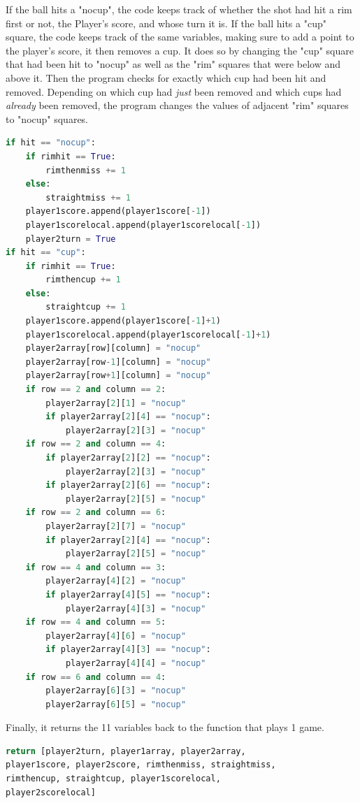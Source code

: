 \documentclass{article}
\begin{document}
If the ball hits a "nocup", the code keeps track of whether the shot had hit a rim first or not, the Player's score, and whose turn it is. If the ball hits a "cup" square, the code keeps track of the same variables, making sure to add a point to the player's score, it then removes a cup. It does so by changing the "cup" square that had been hit to "nocup" as well as the "rim" squares that were below and above it. Then the program checks for exactly which cup had been hit and removed. Depending on which cup had \textit{just} been removed and which cups had \textit{already} been removed, the program changes the values of adjacent "rim" squares to "nocup" squares.

\begin{lstlisting}[language=Python]
if hit == "nocup":
    if rimhit == True:
        rimthenmiss += 1
    else:
        straightmiss += 1
    player1score.append(player1score[-1])
    player1scorelocal.append(player1scorelocal[-1])
    player2turn = True
if hit == "cup":
    if rimhit == True:
        rimthencup += 1
    else:
        straightcup += 1
    player1score.append(player1score[-1]+1)
    player1scorelocal.append(player1scorelocal[-1]+1)
    player2array[row][column] = "nocup"
    player2array[row-1][column] = "nocup"
    player2array[row+1][column] = "nocup"
    if row == 2 and column == 2:
        player2array[2][1] = "nocup"
        if player2array[2][4] == "nocup":
            player2array[2][3] = "nocup"
    if row == 2 and column == 4:
        if player2array[2][2] == "nocup":
            player2array[2][3] = "nocup"
        if player2array[2][6] == "nocup":
            player2array[2][5] = "nocup"
    if row == 2 and column == 6:
        player2array[2][7] = "nocup"
        if player2array[2][4] == "nocup":
            player2array[2][5] = "nocup"
    if row == 4 and column == 3:
        player2array[4][2] = "nocup"
        if player2array[4][5] == "nocup":
            player2array[4][3] = "nocup"
    if row == 4 and column == 5:
        player2array[4][6] = "nocup"
        if player2array[4][3] == "nocup":
            player2array[4][4] = "nocup"
    if row == 6 and column == 4:
        player2array[6][3] = "nocup"
        player2array[6][5] = "nocup"
\end{lstlisting}

Finally, it returns the 11 variables back to the function that plays 1 game.

\begin{lstlisting}[language=Python]
return [player2turn, player1array, player2array, 
player1score, player2score, rimthenmiss, straightmiss,
rimthencup, straightcup, player1scorelocal, 
player2scorelocal]
\end{lstlisting}
\end{document}
